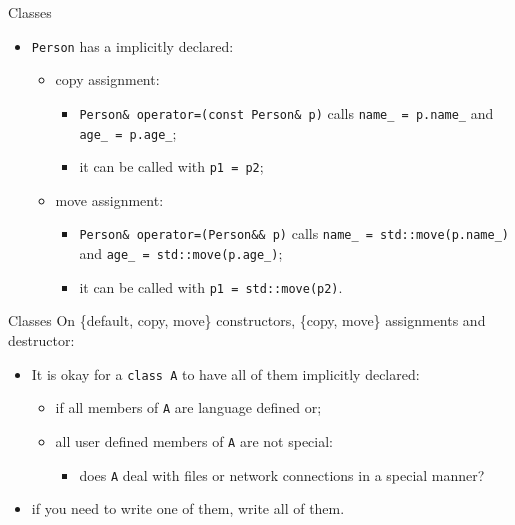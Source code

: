 \documentclass[presentation]{beamer}
\begin{document}
\begin{frame}[label={sec:org70a4c64},fragile]{Classes}
 \begin{itemize}
\item \texttt{Person} has a implicitly declared:
\begin{itemize}
\item copy assignment:
\begin{itemize}
\item \texttt{Person\& operator=(const Person\& p)} calls \texttt{name\_ = p.name\_}
and \texttt{age\_ = p.age\_};
\item it can be called with \texttt{p1 = p2};
\end{itemize}
\item move assignment:
\begin{itemize}
\item \texttt{Person\& operator=(Person\&\& p)} calls \texttt{name\_ =
         std::move(p.name\_)} and \texttt{age\_ = std::move(p.age\_)};
\item it can be called with \texttt{p1 = std::move(p2)}.
\end{itemize}
\end{itemize}
\end{itemize}
\end{frame}
\begin{frame}[label={sec:org17e0433},fragile]{Classes}
 On \{default, copy, move\} constructors, \{copy, move\} assignments and
destructor:
\begin{itemize}
\item It is okay for a \texttt{class A} to have all of them implicitly declared:
\begin{itemize}
\item if all members of \texttt{A} are language defined or;
\item all user defined members of \texttt{A} are not special:
\begin{itemize}
\item does \texttt{A} deal with files or network connections in a special
manner?
\end{itemize}
\end{itemize}
\item if you need to write one of them, write all of them.
\end{itemize}
\end{frame}
\end{document}
